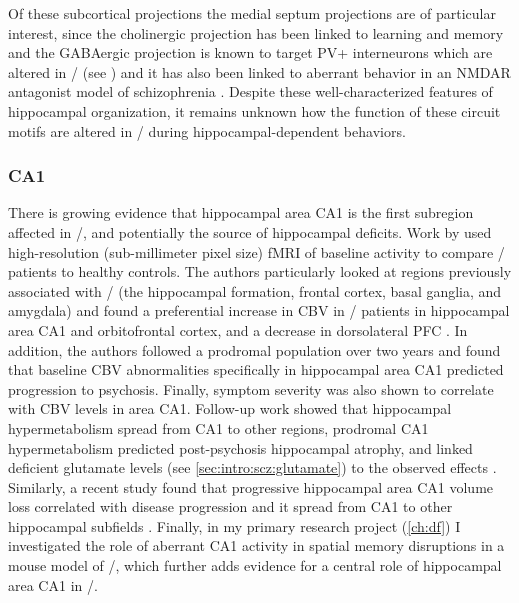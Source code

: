 Of these subcortical projections the medial septum projections are of particular interest, since the cholinergic projection has been linked to learning and memory \citep{Parent2004} and the GABAergic projection is known to target PV+ interneurons \citep{Freund1988} which are altered in \scz/ (see ) and it has also been linked to aberrant behavior in an NMDAR antagonist model of schizophrenia \citep{Ma2012}.
Despite these well-characterized features of hippocampal organization, it remains unknown how the function of these circuit motifs are altered in \scz/ during hippocampal-dependent behaviors.

\subsubsection{CA1}
There is growing evidence that hippocampal area CA1 is the first subregion affected in \scz/, and potentially the source of hippocampal deficits.
Work by \citeauthor{Schobel2009} used high-resolution (sub-millimeter pixel size) \ac{fMRI} of baseline activity to compare \scz/ patients to healthy controls.
The authors particularly looked at regions previously associated with \scz/ (the hippocampal formation, frontal cortex, basal ganglia, and amygdala) and found a preferential increase in \ac{CBV} in \scz/ patients in hippocampal area CA1 and orbitofrontal cortex, and a decrease in dorsolateral \ac{PFC} \citep{Schobel2009}.
In addition, the authors followed a prodromal population over two years and found that baseline \ac{CBV} abnormalities specifically in hippocampal area CA1 predicted progression to psychosis.
Finally, symptom severity was also shown to correlate with \ac{CBV} levels in area CA1.
Follow-up work showed that hippocampal hypermetabolism spread from CA1 to other regions, prodromal CA1 hypermetabolism predicted post-psychosis hippocampal atrophy, and linked deficient glutamate levels (see \autoref{sec:intro:scz:glutamate}) to the observed effects \citep{Schobel2013}.
Similarly, a recent study found that progressive hippocampal area CA1 volume loss correlated with disease progression and it spread from CA1 to other hippocampal subfields \citep{Ho2017}.
Finally, in my primary research project (\autoref{ch:df}) I investigated the role of aberrant CA1 activity in spatial memory disruptions in a mouse model of \scz/, which further adds evidence for a central role of hippocampal area CA1 in \scz/.

